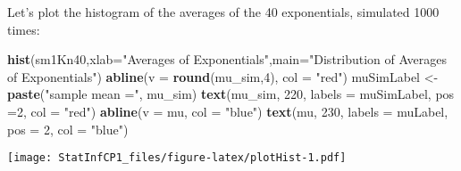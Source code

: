 \documentclass[]{article}
\newenvironment{Shaded}{\begin{snugshade}}{\end{snugshade}}
\newcommand{\DataTypeTok}[1]{\textcolor[rgb]{0.13,0.29,0.53}{#1}}
\newcommand{\DecValTok}[1]{\textcolor[rgb]{0.00,0.00,0.81}{#1}}
\newcommand{\KeywordTok}[1]{\textcolor[rgb]{0.13,0.29,0.53}{\textbf{#1}}}
\newcommand{\NormalTok}[1]{#1}
\newcommand{\StringTok}[1]{\textcolor[rgb]{0.31,0.60,0.02}{#1}}
\begin{document}
Let's plot the histogram of the averages of the 40 exponentials,
simulated 1000 times:

\begin{Shaded}
\begin{Highlighting}[]
\KeywordTok{hist}\NormalTok{(sm1Kn40,}\DataTypeTok{xlab=}\StringTok{"Averages of Exponentials"}\NormalTok{,}\DataTypeTok{main=}\StringTok{"Distribution of Averages of Exponentials"}\NormalTok{)}
\KeywordTok{abline}\NormalTok{(}\DataTypeTok{v =} \KeywordTok{round}\NormalTok{(mu_sim,}\DecValTok{4}\NormalTok{), }\DataTypeTok{col =} \StringTok{"red"}\NormalTok{)}
\NormalTok{muSimLabel <-}\StringTok{ }\KeywordTok{paste}\NormalTok{(}\StringTok{"sample mean ="}\NormalTok{, mu_sim)}
\KeywordTok{text}\NormalTok{(mu_sim, }\DecValTok{220}\NormalTok{, }\DataTypeTok{labels =}\NormalTok{ muSimLabel, }\DataTypeTok{pos =}\DecValTok{2}\NormalTok{,}
     \DataTypeTok{col =} \StringTok{"red"}\NormalTok{)}
\KeywordTok{abline}\NormalTok{(}\DataTypeTok{v =}\NormalTok{ mu, }\DataTypeTok{col =} \StringTok{"blue"}\NormalTok{)}
\KeywordTok{text}\NormalTok{(mu, }\DecValTok{230}\NormalTok{, }\DataTypeTok{labels =}\NormalTok{ muLabel, }\DataTypeTok{pos =} \DecValTok{2}\NormalTok{, }\DataTypeTok{col =} \StringTok{"blue"}\NormalTok{)}
\end{Highlighting}
\end{Shaded}

\texttt{[image: StatInfCP1\_files/figure-latex/plotHist-1.pdf]}
\end{document}
